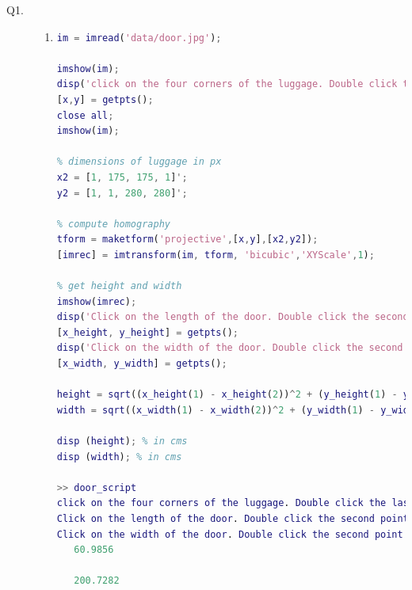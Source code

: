 \documentclass{csc_assignment4}
\begin{document}
\begin{description}

\item[Q1.]
\begin{enumerate}[label=(\alph*)]
\item
\begin{lstlisting}[language=MATLAB]
% read image
im = imread('data/door.jpg');

imshow(im);
disp('click on the four corners of the luggage. Double click the last point');
[x,y] = getpts();
close all;
imshow(im);

% dimensions of luggage in px
x2 = [1, 175, 175, 1]';
y2 = [1, 1, 280, 280]';

% compute homography
tform = maketform('projective',[x,y],[x2,y2]);
[imrec] = imtransform(im, tform, 'bicubic','XYScale',1);

% get height and width
imshow(imrec);
disp('Click on the length of the door. Double click the second point');
[x_height, y_height] = getpts();
disp('Click on the width of the door. Double click the second point');
[x_width, y_width] = getpts();

height = sqrt((x_height(1) - x_height(2))^2 + (y_height(1) - y_height(2))^2)/100;
width = sqrt((x_width(1) - x_width(2))^2 + (y_width(1) - y_width(2))^2)/100;

disp (height); % in cms
disp (width); % in cms

>> door_script
click on the four corners of the luggage. Double click the last point
Click on the length of the door. Double click the second point
Click on the width of the door. Double click the second point
   60.9856 

   200.7282 


\end{lstlisting}
\end{enumerate}
\end{description}
\end{document}
